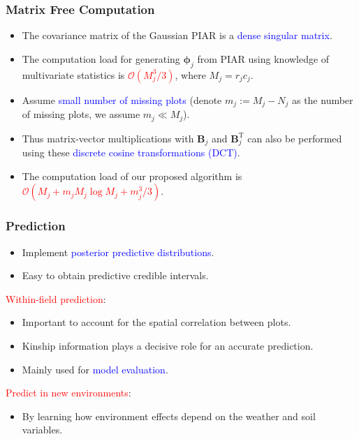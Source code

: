 \documentclass{beamer}
\newcommand{\bB}{\mathbf{B}}
\newcommand{\bphi}{{\bm\phi}}
\newcommand{\sT}{\mathrm{T}}
\begin{document}
\begin{frame}
	\frametitle{Matrix Free Computation}
	
	\begin{itemize}
	\item  The covariance matrix of the Gaussian PIAR is a \textcolor{blue}{dense singular matrix}.
	\item The computation load for generating $\bphi_j$ from PIAR using knowledge of multivariate statistics is \textcolor{red}{${\mathcal O}(M_j^3/3)$}, where $M_j = r_j c_j$.
	\item Assume \textcolor{blue}{small number of missing plots} (denote $m_j:=M_j-N_j$ as the number of missing plots, we assume $m_j \ll M_j$).
	\item Thus matrix-vector multiplications with $\bB_j$ and $\bB^{\sT}_j$ can also be performed using these \textcolor{blue}{discrete cosine transformations (DCT)}.
	\item The computation load of our proposed algorithm is \textcolor{red}{$\mathcal{O}( M_j + m_jM_j \log M_j +  m_j^3/3)$}.	\end{itemize}
	
\end{frame}





\begin{frame}
	\frametitle{Prediction}
	
	\begin{itemize}
	\item Implement \textcolor{blue}{posterior predictive distributions}.
	\item Easy to obtain predictive credible intervals.
	\end{itemize}
	\pause
	\textcolor{red}{Within-field prediction}:
	\begin{itemize}
	\item Important to account for the spatial correlation between plots.
	\item Kinship information plays a decisive role for an accurate prediction.
	\item Mainly used for \textcolor{blue}{model evaluation}.
	\end{itemize}
	\pause
	\textcolor{red}{Predict in new environments}:
	\begin{itemize}
	\item By learning how environment effects depend on the weather and soil variables.
	\end{itemize}
	
\end{frame}
\end{document}
